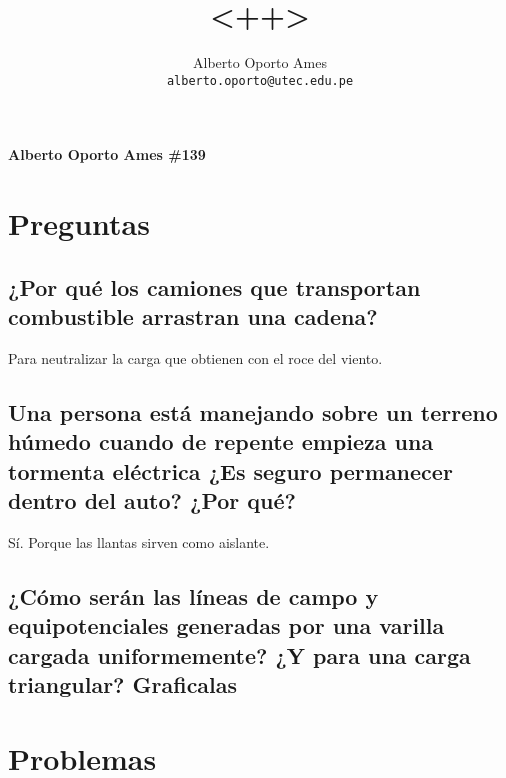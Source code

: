 \documentclass[10pt, twoside]{article}
\title{\textbf{<++>}}
\author{
		Alberto Oporto Ames\\
		\texttt{alberto.oporto@utec.edu.pe}\\
		}
\begin{document}
\textbf{Alberto Oporto Ames \#139}
\thispagestyle{fancy}

\section{Preguntas}%
\label{sec:Preguntas}

\subsection*{¿Por qué los camiones que transportan combustible arrastran una cadena?}%
Para neutralizar la carga que obtienen con el roce del viento.

\subsection*{Una persona está manejando sobre un terreno húmedo cuando de repente
empieza una tormenta eléctrica
¿Es seguro permanecer dentro del auto? ¿Por qué?}%
Sí.
Porque las llantas sirven como aislante.

\subsection*{¿Cómo serán las líneas de campo y equipotenciales generadas por una
varilla cargada uniformemente? ¿Y para una carga triangular?
Graficalas}%

\begin{figure}[H]
	\centering
	\begin{floatrow}
		\ffigbox{}{}
		\ffigbox{}{}
	\end{floatrow}
\end{figure}


\section{Problemas}%
\label{sec:Problemas}
\end{document}
